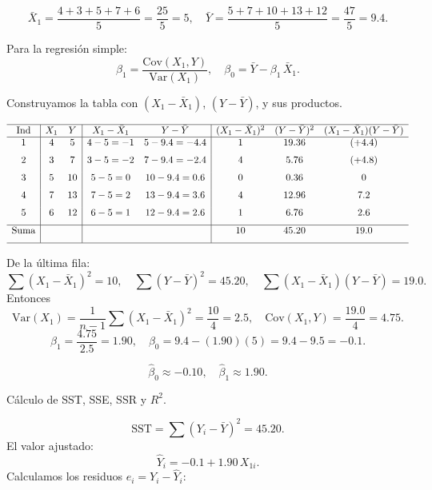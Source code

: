 \documentclass[10pt,a4paper]{article}
\begin{document}
\begin{enumerate}
{\[
\bar{X}_1
= \frac{4+3+5+7+6}{5}
= \frac{25}{5}
= 5,
\quad
\bar{Y}
= \frac{5+7+10+13+12}{5}
= \frac{47}{5}
= 9.4.
\]


Para la regresión simple:
\[
\beta_1
= \frac{\mathrm{Cov}(X_1,Y)}{\mathrm{Var}(X_1)},
\quad
\beta_0
= \bar{Y} - \beta_1\,\bar{X}_1.
\]

Construyamos la tabla con $(X_1-\bar{X}_1)$, $(Y-\bar{Y})$, y sus productos.

\[
\begin{array}{c|cc|cc|ccc}
\hline
\text{Ind} & X_1 & Y 
& X_1-\bar{X}_1 & Y-\bar{Y}
& (X_1 - \bar{X}_1)^2 & (Y - \bar{Y})^2
& (X_1-\bar{X}_1)(Y-\bar{Y})\\
\hline
1 & 4 & 5 
& 4-5=-1
& 5-9.4=-4.4
& 1
& 19.36
& (+4.4) \\[6pt]
2 & 3 & 7
& 3-5=-2
& 7-9.4=-2.4
& 4
& 5.76
& (+4.8) \\[6pt]
3 & 5 & 10
& 5-5=0
& 10-9.4=0.6
& 0
& 0.36
& 0 \\[6pt]
4 & 7 & 13
& 7-5=2
& 13-9.4=3.6
& 4
& 12.96
& 7.2 \\[6pt]
5 & 6 & 12
& 6-5=1
& 12-9.4=2.6
& 1
& 6.76
& 2.6 \\[6pt]
\hline
\text{Suma} & & & & 
& 10
& 45.20
& 19.0 \\[6pt]
\hline
\end{array}
\]

De la última fila:
\[
\sum (X_1-\bar{X}_1)^2 = 10,
\quad
\sum (Y - \bar{Y})^2 = 45.20,
\quad
\sum (X_1-\bar{X}_1)(Y-\bar{Y}) = 19.0.
\]
Entonces
\[
\mathrm{Var}(X_1)
= \frac{1}{n-1}\sum (X_1-\bar{X}_1)^2
= \frac{10}{4}
= 2.5,
\quad
\mathrm{Cov}(X_1,Y)
= \frac{19.0}{4}
= 4.75.
\]
\[
\beta_1
= \frac{4.75}{2.5}
= 1.90,
\quad
\beta_0
= 9.4 - (1.90)(5)
= 9.4 - 9.5
= -0.1.
\]

\[
\boxed{
\widehat{\beta}_0 \approx -0.10,
\quad
\widehat{\beta}_1 \approx 1.90.
}
\]

 C\'alculo de SST, SSE, SSR y $R^2$.

\[
\text{SST}
= \sum (Y_i - \bar{Y})^2
= 45.20.
\]
El valor ajustado: 
\[
\hat{Y}_i
= -0.1 +1.90\,X_{1i}.
\]
Calculamos los residuos $e_i = Y_i - \hat{Y}_i$:

}
\end{enumerate}
\end{document}
